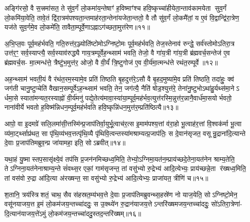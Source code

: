 {\anuvakamend[{स॒प्त॒द॒शम॑न्त॒र्यन्ति॑ वि॒राजीति॒ चतु॑श्चत्वारिशच्च॥३॥}]}

अङ्गि॑रसो॒ वै स॒त्त्रमा॑सत॒ ते सु॑व॒र्गं लो॒कमा॑य॒न्तेषाꣳ॑ ह॒विष्माꣳ॑श्च हवि॒ष्कृच्चा॑हीयेता॒न्ताव॑कामयेता सुव॒र्गं लो॒कमि॑या॒वेति॒ तावे॒तं द्वि॑रा॒त्रम॑पश्यता॒न्तमाह॑रता॒न्तेना॑यजेता॒न्ततो॒ वै तौ सु॑व॒र्गं लो॒कमै॑तां॒ य ए॒वं वि॒द्वान्द्वि॑रा॒त्रेण॒ यज॑ते सुव॒र्गमे॒व लो॒कमे॑ति॒ तावैता॒म्पूर्वे॒णाऽह्नाऽग॑च्छता॒मुत्त॑रेण॥११॥

अ॒भि॒प्ल॒वः पूर्व॒मह॑र्भवति॒ गति॒रुत्त॑र॒ञ्ज्योति॑ष्टोमोऽग्निष्टो॒मः पूर्व॒मह॑र्भवति॒ तेज॒स्तेनाव॑ रुन्द्धे॒ सर्व॑स्तोमोऽतिरा॒त्र उत्त॑र॒ꣳ॒ सर्व॒स्याप्त्यै॒ सर्व॒स्याव॑रुद्ध्यै गाय॒त्रम्पूर्वेह॒न्थ्साम॑ भवति॒ तेजो॒ वै गा॑य॒त्री गा॑य॒त्री ब्र॑ह्मवर्च॒सन्तेज॑ ए॒व ब्र॑ह्मवर्च॒स- मा॒त्मन्ध॑त्ते॒ त्रैष्टु॑भ॒मुत्त॑र॒ ओजो॒ वै वी॒र्यं॑ त्रि॒ष्टुगोज॑ ए॒व वी॒र्य॑मा॒त्मन्ध॑त्ते रथंत॒रम्पूर्वे॥१२॥

अह॒न्थ्साम॑ भवती॒यं वै र॑थंत॒रम॒स्यामे॒व प्रति॑ तिष्ठति बृ॒हदुत्त॑रे॒ऽसौ वै बृ॒हद॒मुष्या॑मे॒व प्रति॑ तिष्ठति॒ तदा॑हुः॒ क्व॑ जग॑ती चानु॒ष्टुप्चेति॑ वैखान॒सम्पूर्वेऽह॒न्थ्साम॑ भवति॒ तेन॒ जग॑त्यै॒ नैति॑ षोड॒श्युत्त॑रे॒ तेना॑नु॒ष्टुभोऽथा॑हु॒र्यथ्स॑मा॒नेऽ र्धमा॒से स्याता॑मन्यत॒रस्याह्नो॑ वी॒र्य॑मनु॑ पद्ये॒तेत्य॑मावा॒स्या॑या॒म्पूर्व॒मह॑र्भव॒त्युत्त॑रस्मि॒न्नुत्त॑र॒न्नानै॒वार्ध॑मा॒सयोर्भवतो॒ नाना॑वीर्ये भवतो ह॒विष्म॑न्निधन॒म्पूर्व॒मह॑र्भवति हवि॒ष्कृन्नि॑धन॒मुत्त॑र॒म्प्रति॑ष्ठित्यै॥१३॥

{\anuvakamend[{उत्त॑रेण रथन्त॒रम्पूर्वेऽन्वेक॑विशतिश्च॥४॥}]}

आपो॒ वा इ॒दमग्रे॑ सलि॒लमा॑सी॒त्तस्मि॑न्प्र॒जाप॑तिर्वा॒युर्भू॒त्वाच॑र॒त्स इ॒माम॑पश्य॒त्तां व॑रा॒हो भू॒त्वाह॑र॒त्तां वि॒श्वक॑र्मा भू॒त्वा व्य॑मा॒र्ट्थ्साप्र॑थत॒ सा पृ॑थि॒व्य॑भव॒त्तत्पृ॑थि॒व्यै पृ॑थिवि॒त्वन्तस्या॑मश्राम्यत्प्र॒जाप॑तिः॒ स दे॒वान॑सृजत॒ वसून्रु॒द्राना॑दि॒त्यान्ते दे॒वाः प्र॒जाप॑तिमब्रुव॒न्प्र जा॑यामहा॒ इति॒ सोऽब्रवीत्॥१४॥

यथा॒हं यु॒ष्मास्तप॒सासृ॑क्ष्ये॒वं तप॑सि प्र॒जन॑नमिच्छध्व॒मिति॒ तेभ्यो॒ऽग्निमा॒यत॑न॒म्प्राय॑च्छदे॒तेना॒यत॑नेन श्राम्य॒तेति॒ तेऽग्निना॒यत॑नेनाश्राम्य॒न्ते सं॑वथ्स॒र एकां॒ गाम॑सृजन्त॒ तां वसु॑भ्यो रु॒द्रेभ्य॑ आदि॒त्येभ्यः॒ प्राय॑च्छन्ने॒ता र॑ख्षध्व॒मिति॒ तां वस॑वो रु॒द्रा आ॑दि॒त्या अ॑रख्षन्त॒ सा वसु॑भ्यो रु॒द्रेभ्य॑ आदि॒त्येभ्यः॒ प्राजा॑यत॒ त्रीणि॑ च॥१५॥

श॒तानि॒ त्रय॑स्त्रिशतं॒ चाथ॒ सैव स॑हस्रत॒म्य॑भव॒त्ते दे॒वाः प्र॒जाप॑तिमब्रुवन्थ्स॒हस्रे॑ण नो याज॒येति॒ सोऽग्निष्टो॒मेन॒ वसू॑नयाजय॒त्त इ॒मं लो॒कम॑जय॒न्तच्चा॑ददुः॒ स उ॒क्थ्ये॑न रु॒द्रान॑याजय॒त्तेऽन्तरि॑ख्षमजय॒न्तच्चा॑ददुः॒ सो॑ऽतिरा॒त्रेणा॑- दि॒त्यान॑याजय॒त्ते॑ऽमुं लो॒कम॑जय॒न्तच्चा॑ददु॒स्तद॒न्तरि॑ख्षम्॥१६॥

